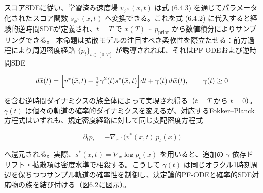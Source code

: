 スコアSDEに従い、学習済み速度場 $v_{\phi^\times}(x,t)$ は式 (6.4.3) を通じてパラメータ化されたスコア関数 $s_{\phi^\times}(x,t)$ へ変換できる。これを式 (6.4.2) に代入すると経験的逆時間SDEが定義され、$t=T$ で $\bar{x}(T)\sim p_{\mathrm{prior}}$ から数値積分によりサンプリングできる。
本命題は拡散モデルの注目すべき柔軟性を際立たせる：前方過程により周辺密度経路 $\{p_t\}_{t\in[0,T]}$ が誘導されれば、それはPF-ODEおよび逆時間SDE

\[
d\bar{x}(t)=\Bigl[v^*(\bar{x},t)-\tfrac{1}{2}\gamma^2(t)s^*(\bar{x},t)\Bigr]dt+\gamma(t)\,d\bar{w}(t),\qquad\gamma(t)\ge 0
\]


を含む逆時間ダイナミクスの族全体によって実現され得る（$t=T$ から $t=0$）。$\gamma(t)$ は個々の軌道の確率的ダイナミクスを変えるが、対応するFokker–Planck方程式はいずれも、規定密度経路に対して同じ支配密度方程式

\[
\partial_t p_t=-\nabla_x\cdot\bigl(v^*(x,t)\,p_t(x)\bigr)
\]


へ還元される。実際、$s^*(x,t)=\nabla_x\log p_t(x)$ を用いると、追加の $\gamma$ 依存ドリフト・拡散項は密度水準で相殺する。こうして $\gamma(t)$ は同じオラクル1時刻周辺を保ちつつサンプル軌道の確率性を制御し、決定論的PF-ODEと確率的SDE対応物の族を結び付ける（図6.2に図示）。

